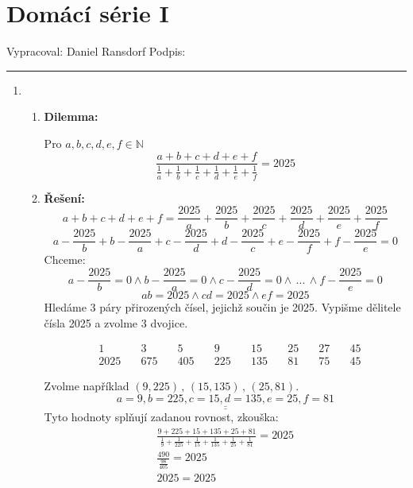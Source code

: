 \documentclass[12pt]{article}
\begin{document}
\section*{Domácí série I}

Vypracoval: Daniel Ransdorf \hfill Podpis: \rule{4cm}{0.4pt}

\begin{enumerate}
  \item
    \begin{enumerate} 
      \item \textbf{Dilemma:}
        
        Pro $a,b,c,d,e,f \in \mathbb{N}$
        \[
        \frac{a+b+c+d+e+f}{\frac{1}{a}+\frac{1}{b}+\frac{1}{c}+\frac{1}{d}+\frac{1}{e}+\frac{1}{f}} = 2025
        \]

        \bigskip
      \item \textbf{Řešení:}
        \[
        a+b+c+d+e+f = \frac{2025}{a}+\frac{2025}{b}+\frac{2025}{c}+\frac{2025}{d}+\frac{2025}{e}+\frac{2025}{f}
        \]
        \[
        a - \frac{2025}{b} + b - \frac{2025}{a} + c - \frac{2025}{d} + d - \frac{2025}{c} + e - \frac{2025}{f} + f - \frac{2025}{e} = 0
        \]
        Chceme:
        \[
        a-\frac{2025}{b} = 0 \land b - \frac{2025}{a} = 0 \land c - \frac{2025}{d} = 0 \land \, ... \, \land f - \frac{2025}{e} = 0
        \]
        \[
        ab=2025 \land cd=2025 \land ef=2025
        \]
        Hledáme 3 páry přirozených čísel, jejichž součin je 2025.
        Vypišme dělitele čísla 2025 a zvolme 3 dvojice.

        \begin{align*}
          &1 \quad &3 \quad &5 \quad &9 \quad &15 \quad &25 \quad &27 \quad &45 \\
          &2025 \quad &675 \quad &405 \quad &225 \quad &135 \quad &81 \quad &75 \quad &45
        \end{align*}

        Zvolme například $(9,225) \, , \,  (15,135) \, , \, (25,81)$.
        \[
          \underline{\underline{a=9, b=225, c=15, d=135, e=25, f=81}}
        \]
        Tyto hodnoty splňují zadanou rovnost, zkouška:
        \begin{align*}
          \frac{9+225+15+135+25+81}{\frac{1}{9}+\frac{1}{225}+\frac{1}{15}+\frac{1}{135}+\frac{1}{25}+\frac{1}{81}} = 2025 \\
          \frac{490}{\frac{98}{405}}=2025 \\
          2025=2025       
        \end{align*}


\end{enumerate}
\end{enumerate}
\end{document}

